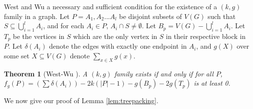 \documentclass{article}
\newtheorem{theorem}{Theorem}[section]
\begin{document}
West and Wu a necessary and sufficient condition for the existence of a $(k,g)$ family in a graph. Let $P = A_1, A_2...A_l$ be disjoint subsets of $V(G)$ such that $S \subseteq \bigcup_{i=1}^l A_i$, and for each $A_i \in P$, $A_i \cap S \not= \emptyset$. Let $B_p = V(G) - \bigcup_{i=1}^l A_i$. Let $T_p$ be the vertices in $S$ which are the only vertex in $S$ in their respective block in $P$. Let $\delta(A_i)$ denote the edges with exactly one endpoint in $A_i$, and $g(X)$ over some set $X \subseteq V(G)$ denote $\sum_{x \in X}g(x)$. 

\begin{theorem}[West-Wu \cite{westwu}]
    A $(k,g)$ family exists if and only if for all $P$, $f_g(P) = (\sum \delta(A_i))-2k(|P|-1)-g(B_p)-2g(T_p)$ is at least 0.
\end{theorem}

We now give our proof of Lemma \ref{lem:treepacking}. 
\end{document}
